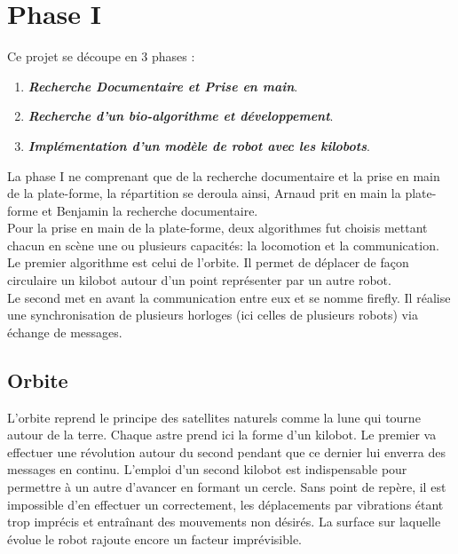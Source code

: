 \documentclass[a4paper,8pt]{report}
\begin{document}
\chapter{Phase I}

Ce projet se d\'ecoupe en 3 phases :

\begin{enumerate}[{Phase}-1 ]
\item \textit{\textbf{Recherche Documentaire et Prise en main}}.
\item \textit{\textbf{Recherche d'un bio-algorithme et d\'eveloppement}}.
\item \textit{\textbf{Impl\'ementation d'un mod\`ele de robot avec les kilobots}}.
\end{enumerate}

\bigskip
La phase I ne comprenant que de la recherche documentaire et la prise en main de la plate-forme, la r\'epartition se deroula ainsi, Arnaud prit en main la plate-forme et Benjamin la recherche documentaire.\\
Pour la prise en main de la plate-forme, deux algorithmes fut choisis mettant chacun en scène une ou plusieurs capacit\'es: la locomotion et la communication.\\
Le premier algorithme est celui de l'orbite. Il permet de d\'eplacer de façon circulaire un kilobot autour d'un point repr\'esenter par un autre robot.\\
Le second met en avant la communication entre eux et se nomme firefly. Il r\'ealise une synchronisation de plusieurs horloges (ici celles de plusieurs robots) via \'echange de messages.\\

\section*{Orbite}\label{sec:name}

L'orbite reprend le principe des satellites naturels comme la lune qui tourne autour de la terre. Chaque astre prend ici la forme d'un kilobot. Le premier va effectuer une r\'evolution autour du second pendant que ce dernier lui enverra des messages en continu. L'emploi d'un second kilobot est indispensable pour permettre à un autre d'avancer en formant un cercle. Sans point de repère, il est impossible d'en effectuer un correctement, les d\'eplacements par vibrations \'etant trop impr\'ecis et entraînant des mouvements non d\'esir\'es. La surface sur laquelle \'evolue le robot rajoute encore un facteur impr\'evisible.
\end{document}
